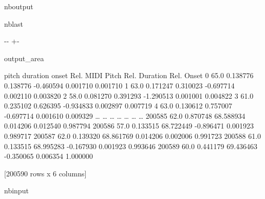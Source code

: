 \documentclass[letterpaper,10pt,english]{sphinxmanual}
\newlength\nbsphinxcodecellspacing
\begin{document}
\begin{sphinxuseclass}{nboutput}
\begin{sphinxuseclass}{nblast}
{

\kern-\sphinxverbatimsmallskipamount\kern-\baselineskip
\kern+\FrameHeightAdjust\kern-\fboxrule
\vspace{\nbsphinxcodecellspacing}

\begin{sphinxuseclass}{output_area}
\begin{sphinxuseclass}{}


\begin{sphinxVerbatim}[commandchars=\\\{\}]
\llap{\color{nbsphinxout}[43]:\,\hspace{\fboxrule}\hspace{\fboxsep}}        pitch  duration      onset  Rel. MIDI Pitch  Rel. Duration  Rel. Onset
0        65.0  0.138776   0.138776        -0.460594       0.001710    0.001710
1        63.0  0.171247   0.310023        -0.697714       0.002110    0.003820
2        58.0  0.081270   0.391293        -1.290513       0.001001    0.004822
3        61.0  0.235102   0.626395        -0.934833       0.002897    0.007719
4        63.0  0.130612   0.757007        -0.697714       0.001610    0.009329
{\ldots}       {\ldots}       {\ldots}        {\ldots}              {\ldots}            {\ldots}         {\ldots}
200585   62.0  0.870748  68.588934         0.014206       0.012540    0.987794
200586   57.0  0.133515  68.722449        -0.896471       0.001923    0.989717
200587   62.0  0.139320  68.861769         0.014206       0.002006    0.991723
200588   61.0  0.133515  68.995283        -0.167930       0.001923    0.993646
200589   60.0  0.441179  69.436463        -0.350065       0.006354    1.000000

[200590 rows x 6 columns]
\end{sphinxVerbatim}



\end{sphinxuseclass}
\end{sphinxuseclass}
}

\end{sphinxuseclass}
\end{sphinxuseclass}
\begin{sphinxuseclass}{nbinput}
{
\begin{sphinxVerbatim}[commandchars=\\\{\}]
\llap{\color{nbsphinxin}[62]:\,\hspace{\fboxrule}\hspace{\fboxsep}}\PYG{p}{[}\PYG{p}{]}
\end{sphinxVerbatim}
}

\end{sphinxuseclass}
\end{document}
